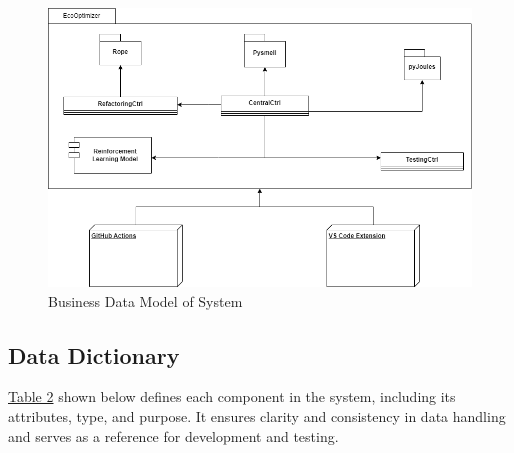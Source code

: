 \documentclass[12pt]{article}
\begin{document}
\begin{figure}[H]
  \centering
  \includegraphics[width=\textwidth]{../Images/business-data-model.png}
  \caption{Business Data Model of System}
  \label{img:bdata-model}
\end{figure}

\subsection{Data Dictionary}
\hyperref[tab:data-dict]{Table 2} shown below defines each component in the system, including its attributes, type, and purpose. It ensures clarity and consistency in data handling and serves as a reference for development and testing.
\end{document}
